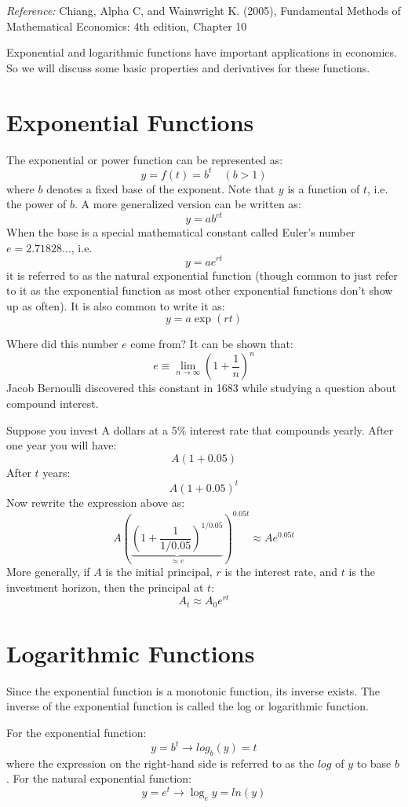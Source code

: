 \documentclass{./../Latex/handout}
\begin{document}
\thispagestyle{plain}
\newcommand{\mytitle}{Exponential and Logarithmic Functions}
\myheader{\mytitle}

\textit{Reference:} Chiang, Alpha C, and Wainwright K. (2005), Fundamental Methods of Mathematical Economics: 4th edition, Chapter 10 

Exponential and logarithmic functions have important applications in economics. So we will discuss some basic properties and derivatives for these functions.

\section{Exponential Functions}
The exponential or power function can be represented as:
$$
y=f(t)=b^{t} \quad(b>1)
$$
where $b$ denotes a fixed base of the exponent. Note that $y$ is a function of $t$, i.e. the power of $b$. A more generalized version can be written as:
$$
y=a b^{c t}
$$ 
When the base is a special mathematical constant called Euler's number $e=2.71828...$, i.e.
$$
y=a e^{r t}
$$
it is referred to as the natural exponential function (though common to just refer to it as the exponential function as most other exponential functions don't show up as often). It is also common to write it as:
$$
y=a \exp (r t)
$$ 

Where did this number $e$ come from? It can be shown that:
$$
e \equiv \lim _{n \rightarrow \infty}\left(1+\frac{1}{n}\right)^{n}
$$
Jacob Bernoulli discovered this constant in 1683 while studying a question about compound interest. 

Suppose you invest A dollars at a 5\% interest rate that compounds yearly. After one year you will have:
\[ A \left(1+0.05\right)  \] 
After $t$ years:
\[ A \left(1+0.05\right)^{t} \]
Now rewrite the expression above as:
\[ A\left( \underbrace{\left(1+\frac{1}{1/0.05}\right)^{1/0.05}}_{\approx e} \right)^{0.05t} \approx A e^{0.05t}  \]
More generally, if $A$ is the initial principal, $r$ is the interest rate, and $t$ is the investment horizon, then the principal at $t$:
$$ A_t \approx A_0 e^{rt} $$

\section{Logarithmic Functions}
Since the exponential function is a monotonic function, its inverse exists. The inverse of the exponential function is called the log or logarithmic function.

For the exponential function: 
\[ y=b^{t} \rightarrow log_b(y) = t  \]
where the expression on the right-hand side is referred to as the $log$ of $y$ to base $b$. For the natural exponential function:
\[y=e^{t} \rightarrow \log _{e} y =ln(y) \]
\end{document}
